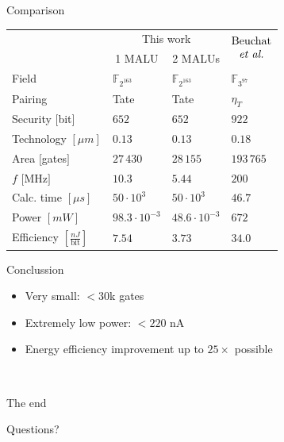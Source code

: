 \documentclass[svgnames]{beamer}
\begin{document}
\begin{frame}{Comparison}
\vfill
\begin{center}
\small{\begin{tabular}{llll}
			\toprule
			&	\multicolumn{2}{c}{This work}	& \multirow{2}{*}{$\begin{array}{@{}c@{}}\text{Beuchat}\\\text{\emph{et al.}}\end{array}$}\\
			\cmidrule(r){2-3}
			& \multicolumn{1}{c}{1 MALU} & \multicolumn{1}{c}{2 MALUs} &\\
	 		\midrule
			Field																& $\mathbb{F}_{2^{163}}$	& $\mathbb{F}_{2^{163}}$	& $\mathbb{F}_{3^{97}}$\\
			Pairing															& Tate							& Tate							& $\eta_T$\\
			Security $[$bit$]$											& $652$							& $652$							& $922$\\
			Technology $[\mu m]$											& $0.13$							& $0.13$							& $0.18$\\
			Area $[$gates$]$												& $27\,430$						& $28\,155$						& $193\,765$\\
			$f$ $[$MHz$]$													& $10.3$							& $5.44$							& $200$\\
			Calc. time $[\mu s]$											& $50 \cdot 10^3$				& $50 \cdot 10^3$				& $46.7$\\
			Power $[mW]$													& $98.3 \cdot 10^{-3}$		& $48.6 \cdot 10^{-3}$		& $672$\\
			Efficiency $\left[ \frac{nJ}{\text{bit}}\right]$	& $7.54$							& $3.73$							& $34.0$\\
			\bottomrule		
		\end{tabular}}
\end{center}
\vfill
\end{frame}

\begin{frame}{Conclussion}
	\begin{itemize}
		\item Very small: $< 30$k gates
		\item Extremely low power: $<220$ nA
		\item Energy efficiency improvement up to $25 \times$ possible
	\end{itemize}
	
	\\[3em]
	
	\begin{center}
	\end{center}
\end{frame}

\begin{frame}{The end}
	\begin{center}\LARGE Questions?\end{center}
\end{frame}
\end{document}

